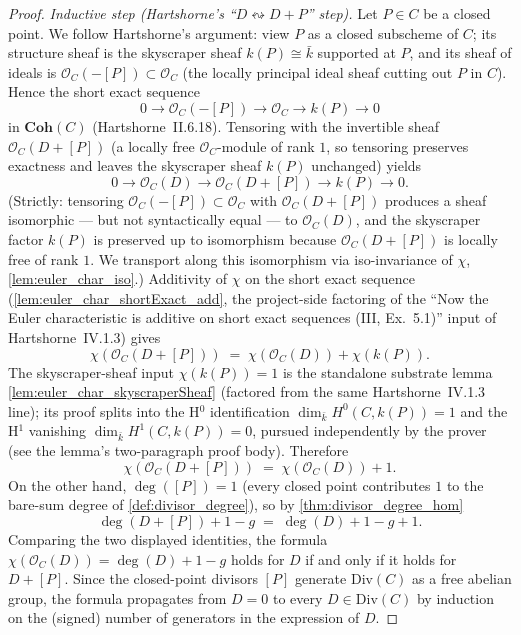 \begin{proof}
  \emph{Inductive step (Hartshorne's ``\(D \leftrightsquigarrow D + P\)''
  step).} Let \(P \in C\) be a closed point. We follow Hartshorne's
  argument: view \(P\) as a closed subscheme of \(C\); its structure
  sheaf is the skyscraper sheaf \(k(P) \cong \bar k\) supported at \(P\),
  and its sheaf of ideals is \(\mathcal O_C(-[P]) \subset \mathcal O_C\)
  (the locally principal ideal sheaf cutting out \(P\) in \(C\)). Hence
  the short exact sequence
  \[
    0 \to \mathcal O_C(-[P]) \to \mathcal O_C \to k(P) \to 0
  \]
  in \(\mathbf{Coh}(C)\) (Hartshorne~II.6.18). Tensoring with the
  invertible sheaf \(\mathcal O_C(D + [P])\) (a locally free
  \(\mathcal O_C\)-module of rank \(1\), so tensoring preserves exactness
  and leaves the skyscraper sheaf \(k(P)\) unchanged) yields
  \[
    0 \to \mathcal O_C(D)
    \to \mathcal O_C(D + [P])
    \to k(P) \to 0.
  \]
  (Strictly: tensoring \(\mathcal O_C(-[P]) \subset \mathcal O_C\) with
  \(\mathcal O_C(D + [P])\) produces a sheaf isomorphic — but not
  syntactically equal — to \(\mathcal O_C(D)\), and the skyscraper
  factor \(k(P)\) is preserved up to isomorphism because
  \(\mathcal O_C(D + [P])\) is locally free of rank \(1\). We transport
  along this isomorphism via iso-invariance of \(\chi\),
  \cref{lem:euler_char_iso}.)
  Additivity of \(\chi\) on the short exact sequence
  (\cref{lem:euler_char_shortExact_add}, the project-side
  factoring of the ``Now the Euler characteristic is additive on short
  exact sequences (III, Ex.~5.1)'' input of Hartshorne~IV.1.3) gives
  \[
    \chi(\mathcal O_C(D + [P]))
    \;=\;
    \chi(\mathcal O_C(D)) + \chi(k(P)).
  \]
  The skyscraper-sheaf input
  \(\chi(k(P)) = 1\) is the standalone substrate lemma
  \cref{lem:euler_char_skyscraperSheaf} (factored from the
  same Hartshorne~IV.1.3 line); its proof splits into the
  H\(^0\) identification \(\dim_{\bar k} H^0(C, k(P)) = 1\) and the
  H\(^1\) vanishing \(\dim_{\bar k} H^1(C, k(P)) = 0\), pursued
  independently by the prover (see the lemma's two-paragraph proof
  body). Therefore
  \[
    \chi(\mathcal O_C(D + [P])) \;=\; \chi(\mathcal O_C(D)) + 1.
  \]
  On the other hand, \(\deg([P]) = 1\) (every closed point contributes
  \(1\) to the bare-sum degree of \cref{def:divisor_degree}), so by
  \cref{thm:divisor_degree_hom}
  \[
    \deg(D + [P]) + 1 - g \;=\; \deg(D) + 1 - g + 1.
  \]
  Comparing the two displayed identities, the formula
  \(\chi(\mathcal O_C(D)) = \deg(D) + 1 - g\) holds for \(D\) if and only
  if it holds for \(D + [P]\). Since the closed-point divisors \([P]\)
  generate \(\mathrm{Div}(C)\) as a free abelian group, the formula propagates
  from \(D = 0\) to every \(D \in \mathrm{Div}(C)\) by induction on the (signed)
  number of generators in the expression of \(D\).

\end{proof}

